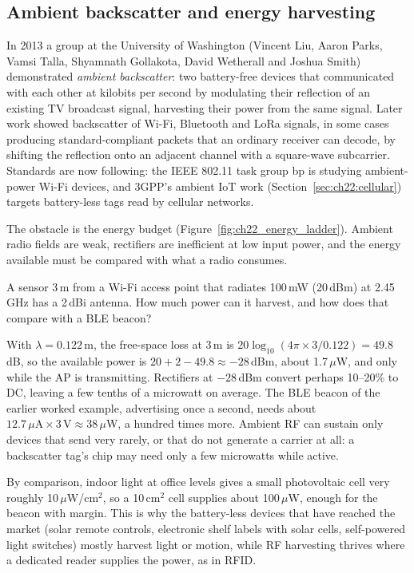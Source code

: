 \subsection{Ambient backscatter and energy harvesting}

In 2013 a group at the University of Washington (Vincent Liu, Aaron Parks, Vamsi Talla, Shyamnath
Gollakota, David Wetherall and Joshua Smith) demonstrated \emph{ambient backscatter}: two battery-free
devices that communicated with each other at kilobits per second by modulating their reflection of an
existing TV broadcast signal, harvesting their power from the same signal. Later work showed
backscatter of Wi-Fi, Bluetooth and LoRa signals, in some cases producing standard-compliant packets
that an ordinary receiver can decode, by shifting the reflection onto an adjacent channel with a
square-wave subcarrier. Standards are now following: the IEEE 802.11 task group bp is studying
ambient-power Wi-Fi devices, and 3GPP's ambient IoT work (Section~\ref{sec:ch22:cellular}) targets
battery-less tags read by cellular networks.

The obstacle is the energy budget (Figure~\ref{fig:ch22_energy_ladder}). Ambient radio fields are weak, rectifiers are inefficient at low
input power, and the energy available must be compared with what a radio consumes.

\begin{worked}
A sensor 3\,m from a Wi-Fi access point that radiates 100\,mW (20\,dBm) at 2.45\,GHz has a 2\,dBi
antenna. How much power can it harvest, and how does that compare with a BLE beacon?

With $\lambda=0.122$\,m, the free-space loss at 3\,m is $20\log_{10}(4\pi\times3/0.122)=49.8$\,dB, so the
available power is $20+2-49.8\approx-28$\,dBm, about 1.7\,$\mu$W, and only while the AP is transmitting.
Rectifiers at $-28$\,dBm convert perhaps 10--20\% to DC, leaving a few tenths of a microwatt on
average. The BLE beacon of the earlier worked example, advertising once a second, needs about
$12.7\,\mu\text{A}\times3\,\text{V}\approx38\,\mu$W, a hundred times more. Ambient RF can sustain only
devices that send very rarely, or that do not generate a carrier at all: a backscatter tag's chip may
need only a few microwatts while active.

By comparison, indoor light at office levels gives a small photovoltaic cell very roughly
10\,$\mu$W/cm$^2$, so a 10\,cm$^2$ cell supplies about 100\,$\mu$W, enough for the beacon with margin.
This is why the battery-less devices that have reached the market (solar remote controls, electronic
shelf labels with solar cells, self-powered light switches) mostly harvest light or motion, while RF
harvesting thrives where a dedicated reader supplies the power, as in RFID.
\end{worked}

